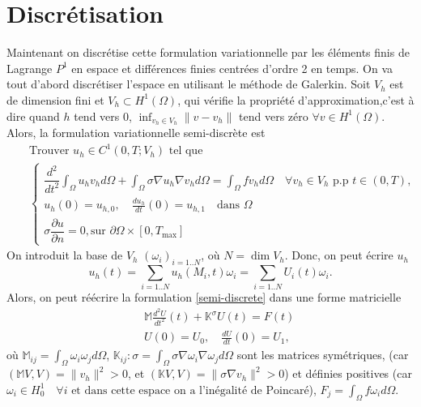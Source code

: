 \documentclass[12pt]{article}
\newcommand{\pd}[2]{ %
	\dfrac{\partial #1}{\partial #2}
}
\begin{document}
\section{Discrétisation}
Maintenant on discrétise cette formulation variationnelle par les éléments finis de Lagrange $P^1$ en espace et différences finies centrées d’ordre 2 en temps. On va tout d'abord discrétiser l'espace en utilisant le méthode de Galerkin. Soit $V_h$ est de dimension fini et $V_h \subset H^1(\Omega)$, qui vérifie la propriété d'approximation,c'est à dire quand $h$ tend vers 0, $\inf_{v_h\in V_h}\|v - v_h\|$ tend vers zéro $\forall v \in H^1(\Omega)$. Alors, la formulation variationnelle semi-discrète est
\begin{eqnarray}
\nonumber
& &\text{Trouver } u_h \in C^1(0, T; V_h) \text{ tel que}\\[2mm]
\label{semi-discrete}
& &\begin{cases}
\dfrac{d^2}{dt^2} \int_\Omega {u_h v_h d\Omega} + \int_\Omega{\sigma \nabla u_h \nabla v_h d\Omega} = \int_\Omega{f v_h d\Omega} \quad \forall v_h \in V_h \text{ p.p } t \in (0,T),\\
u_h(0) = u_{h,0}, \quad \frac{d u_h}{dt}(0) = u_{h,1} \quad \text{dans } \Omega \\
\sigma \pd{u}{n} = 0, \text{sur } \partial\Omega \times [0, T_\text{max}]
\end{cases}
\end{eqnarray}
On introduit la base de $V_h$ $(\omega_i)_{i = 1..N}$, où $N = \dim{V_h}$. Donc, on peut écrire $u_h$
\begin{equation}
u_h(t) = \sum_{i = 1..N}{u_h(M_i, t)\omega_i} = \sum_{i = 1..N}{U_i(t)\omega_i}.
\end{equation} 
Alors, on peut réécrire la formulation \eqref{semi-discrete} dans une forme matricielle
\begin{eqnarray}
\label{matr_semi_discrete}
	& &\mathbb{M}\frac{d^2U}{dt^2}(t) + \mathbb{K}^\sigma U(t) = F(t)\\
	& &U(0) = U_0, \quad \frac{dU}{dt}(0) = U_1,
\end{eqnarray}
où $\mathbb{M}_{ij} = \int_\Omega{\omega_i \omega_j d\Omega}$, $\mathbb{K}_{ij}:\sigma = \int_\Omega{\sigma\nabla\omega_i \nabla\omega_j d\Omega}$ sont les matrices symétriques, (car $(\mathbb{M}V,V) = \|v_h\|^2 > 0$, et $(\mathbb{K}V,V) = \|\sigma\nabla v_h\|^2 > 0$) et définies positives (car $\omega_i \in H^1_0 \quad \forall i \text{ et dans cette espace on a l'inégalité de Poincaré}$), $F_j = \int_{\Omega}{f\omega_i d\Omega}$.
\end{document}
